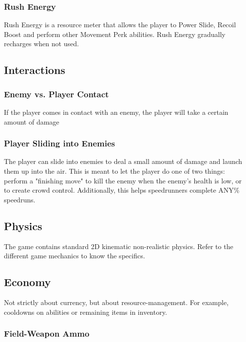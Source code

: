 \documentclass[12pt]{article}
\begin{document}
\subsubsection{Rush Energy}

Rush Energy is a resource meter that allows the player to Power Slide, Recoil Boost and perform other Movement Perk abilities. Rush Energy gradually recharges when not used. 

\subsection{Interactions}

\subsubsection{Enemy vs. Player Contact}

If the player comes in contact with an enemy, the player will take a certain amount of damage

\subsubsection{Player Sliding into Enemies}

The player can slide into enemies to deal a small amount of damage and launch them up into the air. This is meant to let the player do one of two things: perform a "finishing move" to kill the enemy when the enemy's health is low, or to create crowd control. Additionally, this helps speedrunners complete ANY\% speedruns. 

\subsection{Physics}

The game contains standard 2D kinematic non-realistic physics. Refer to the different game mechanics to know the specifics.

\subsection{Economy}

Not strictly about currency, but about resource-management. For example, cooldowns on abilities or remaining items in inventory. 

\subsubsection{Field-Weapon Ammo}
\end{document}
